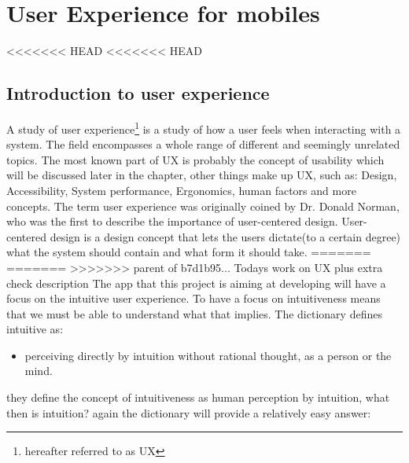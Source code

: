 \section{User Experience for mobiles}
<<<<<<< HEAD
<<<<<<< HEAD
\subsection{Introduction to user experience }
A study of user experience\footnote{hereafter referred to as UX} is a study of how a user feels when interacting with a system. The field encompasses a whole range of different and seemingly unrelated topics. The most known part of UX is probably the concept of usability which will be discussed later in the chapter, other things make up UX, such as: Design, Accessibility, System performance, Ergonomics, human factors and more concepts. The term user experience  was originally coined by Dr. Donald Norman, who was the first to describe the importance of user-centered design. User-centered design is a design concept that lets the users dictate(to a certain degree) what the system should contain and what form it should take.
=======
=======
>>>>>>> parent of b7d1b95... Todays work on UX plus extra check description
The app that this project is aiming at developing will have a focus on the intuitive user experience. To have a focus on intuitiveness means that we must be able to understand what that implies. The dictionary defines intuitive as: 
\begin{itemize}
\item perceiving directly by intuition without rational thought, as a person or the mind.
\end{itemize}
they define the concept of intuitiveness as human perception by intuition, what then is intuition? again the dictionary will provide a relatively easy answer: 
